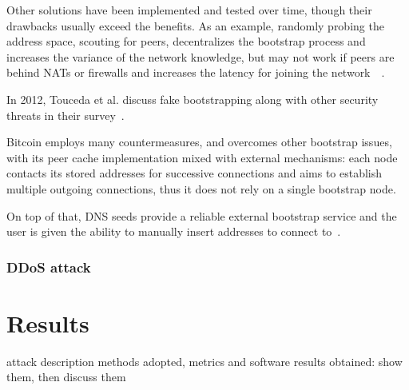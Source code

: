\documentclass[12pt, letterpaper, twoside]{article}
\begin{document}
Other solutions have been implemented and tested over time, though their drawbacks usually exceed the benefits. As an example, randomly probing the address space, scouting for peers, decentralizes the bootstrap process and increases the variance of the network knowledge, but may not work if peers are behind NATs or firewalls and increases the latency for joining the network~\cite{decentrbootstrapp2p}~\cite{localityaware}.

In 2012,  Touceda et al. discuss fake bootstrapping along with other security threats in their survey~\cite{toucedafakeboot}.

Bitcoin employs many countermeasures, and overcomes other bootstrap issues, with its peer cache implementation mixed with external mechanisms: each node contacts its stored addresses for successive connections and aims to establish multiple outgoing connections, thus it does not rely on a single bootstrap node.

On top of that, DNS seeds provide a reliable external bootstrap service and the user is given the ability to manually insert addresses to connect to~\cite{mahmoud_netsec_boot}.


\subsubsection{DDoS attack}\label{sec:ddos}


\section{Results}\label{sec:res}
attack description
methods adopted, metrics and software
results obtained: show them, then discuss them




















\end{document}
